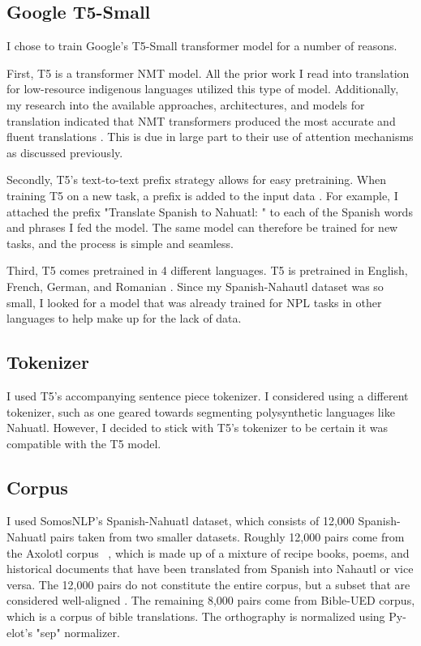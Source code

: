 \documentclass[10pt,twocolumn]{article}
\begin{document}
\subsection{Google T5-Small}
I chose to train Google's T5-Small transformer model for a number of reasons.

First, T5 is a transformer NMT model. All the prior work I read into translation for low-resource indigenous languages utilized this type of model. Additionally, my research into the available approaches, architectures, and models for translation indicated that NMT transformers produced the most accurate and fluent translations \cite{Transformers}. This is due in large part to their use of  attention mechanisms as discussed previously. 

Secondly, T5's text-to-text prefix strategy allows for easy pretraining. When training T5 on a new task, a prefix is added to the input data \cite{T5Model}. For example, I attached the prefix "Translate Spanish to Nahuatl: " to each of the Spanish words and phrases I fed the model. The same model can therefore be trained for new tasks, and the process is simple and seamless.

Third, T5 comes pretrained in 4 different languages.  T5 is pretrained in English, French, German, and Romanian \cite{T5Model}. Since my Spanish-Nahautl dataset was so small, I looked for a model that was already trained for NPL tasks in other languages to help make up for the lack of data.


\subsection{Tokenizer}
I used T5's accompanying sentence piece tokenizer. I considered using a different tokenizer, such as one geared towards segmenting polysynthetic languages like Nahuatl. However, I decided to stick with T5's tokenizer to be certain it was compatible with the T5 model. 

\subsection{Corpus}
I used SomosNLP's Spanish-Nahuatl dataset, which consists of 12,000 Spanish-Nahuatl pairs taken from two smaller datasets. Roughly 12,000 pairs come from the Axolotl corpus \cite{AxolotlCorpus} \, , which is made up of a mixture of recipe books, poems, and historical documents that have been translated from Spanish into Nahautl or vice versa. The 12,000 pairs do not constitute the entire corpus, but a subset that are considered well-aligned \cite{SomosNLPDataset} .  The remaining 8,000 pairs come from Bible-UED corpus, which is a corpus of bible translations. The orthography is normalized using Py-elot's "sep" normalizer.
\end{document}
